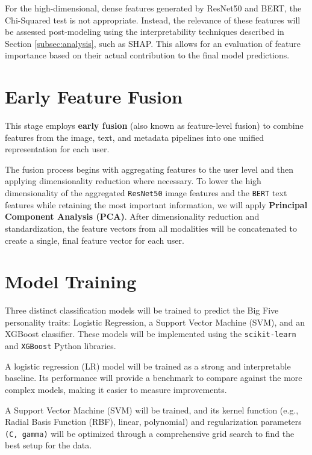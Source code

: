 For the high-dimensional, dense features generated by ResNet50 and BERT, the Chi-Squared test is not appropriate. Instead, the relevance of these features will be assessed post-modeling using the interpretability techniques described in Section \ref{subsec:analysis}, such as SHAP. This allows for an evaluation of feature importance based on their actual contribution to the final model predictions.

\section{Early Feature Fusion}
\label{subsec:fusion}
This stage employs \textbf{early fusion} (also known as feature-level fusion) to combine features from the image, text, and metadata pipelines into one unified representation for each user.

The fusion process begins with aggregating features to the user level and then applying dimensionality reduction where necessary. To lower the high dimensionality of the aggregated \texttt{ResNet50} image features and the \texttt{BERT} text features while retaining the most important information, we will apply \textbf{Principal Component Analysis (PCA)}. After dimensionality reduction and standardization, the feature vectors from all modalities will be concatenated to create a single, final feature vector for each user.

\section{Model Training}
\label{subsec:models}

Three distinct classification models will be trained to predict the Big Five personality traits: Logistic Regression, a Support Vector Machine (SVM), and an XGBoost classifier. These models will be implemented using the \texttt{scikit-learn} \citep{pedregosa2011} and \texttt{XGBoost} \citep{chen2016} Python libraries.

A logistic regression (LR) model will be trained as a strong and interpretable baseline. Its performance will provide a benchmark to compare against the more complex models, making it easier to measure improvements.

A Support Vector Machine (SVM) will be trained, and its kernel function (e.g., Radial Basis Function (RBF), linear, polynomial) and regularization parameters \texttt{(C, gamma)} will be optimized through a comprehensive grid search to find the best setup for the data.

